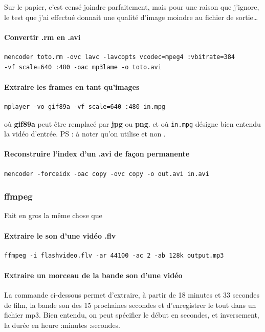 \documentclass[a4paper,twoside]{article}
\begin{document}
\begin{remarque}
Sur le papier, c'est censé joindre parfaitement, mais pour une raison que j'ignore, le test que j'ai effectué donnait une qualité d'image moindre au fichier de sortie\ldots
\end{remarque}

\paragraph{Convertir .rm en .avi}
\begin{verbatim}
mencoder toto.rm -ovc lavc -lavcopts vcodec=mpeg4 :vbitrate=384
-vf scale=640 :480 -oac mp3lame -o toto.avi
\end{verbatim}

\paragraph{Extraire les frames en tant qu'images}
\begin{verbatim}
mplayer -vo gif89a -vf scale=640 :480 in.mpg
\end{verbatim}
où \textbf{gif89a} peut être remplacé par \textbf{jpg} ou \textbf{png}. et où \verb|in.mpg| désigne bien entendu la vidéo d'entrée.
PS : à noter qu'on utilise  et non .

\paragraph{Reconstruire l'index d'un .avi de façon permanente}
\begin{verbatim}
mencoder -forceidx -oac copy -ovc copy -o out.avi in.avi
\end{verbatim}

\subsubsection{ffmpeg}
Fait en gros la même chose que 
\paragraph{Extraire le son d'une vidéo .flv}
\begin{verbatim}
ffmpeg -i flashvideo.flv -ar 44100 -ac 2 -ab 128k output.mp3
\end{verbatim}

\paragraph{Extraire un morceau de la bande son d'une vidéo}
La commande ci-dessous permet d'extraire, à partir de 18 minutes et 33 secondes de film, la bande son des 15 prochaines secondes et d'enregistrer le tout dans un fichier mp3. Bien entendu, on peut spécifier le début en secondes, et inversement, la durée en heure :minutes :secondes.\par
\end{document}

